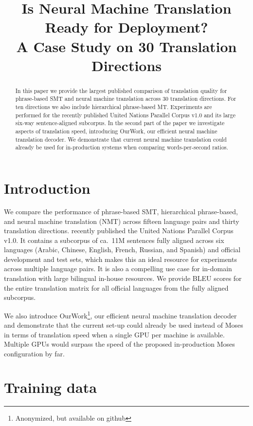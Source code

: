 \documentclass[11pt]{article}
\title{Is Neural Machine Translation Ready for Deployment? \\ A Case Study on 30 Translation Directions}
\date{}
\begin{document}
 \maketitle

 \begin{abstract}
In this paper we provide the largest published comparison of translation quality for phrase-based SMT and neural machine translation across 30 translation directions. For ten directions we also include hierarchical phrase-based MT. Experiments are performed for the recently published United Nations Parallel Corpus v1.0 and its large six-way sentence-aligned subcorpus. 
In the second part of the paper we investigate aspects of translation speed, introducing OurWork, our efficient neural machine translation decoder. We demonstrate that current neural machine translation could already be used for in-production systems when comparing words-per-second ratios.

\end{abstract}

\section{Introduction}

We compare the performance of phrase-based SMT, hierarchical phrase-based, and neural machine translation (NMT) across fifteen language pairs and thirty translation directions. \cite{ZIEMSKI16.1195} recently published the United Nations Parallel Corpus v1.0. It contains a subcorpus of ca.~11M sentences fully aligned across six languages (Arabic, Chinese, English, French, Russian, and Spanish) and official development and test sets, which makes this an ideal resource for experiments across multiple language pairs. It is also a compelling use case for in-domain translation with large bilingual in-house resources. We provide BLEU scores for the entire translation matrix for all official languages from the fully aligned subcorpus. 

We also introduce OurWork\footnote{Anonymized, but available on github}, our efficient neural machine translation decoder and demonstrate that the current set-up could already be used instead of Moses in terms of translation speed when a single GPU per machine is available. Multiple GPUs would surpass the speed of the proposed in-production Moses configuration by far. 

\section{Training data}
\end{document}
